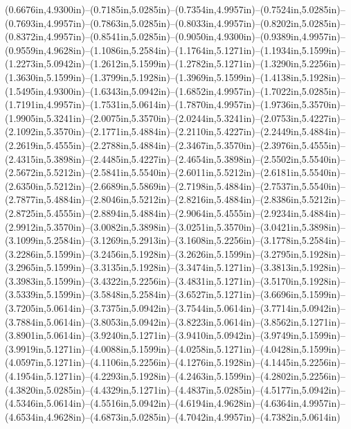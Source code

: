 (0.6676in,4.9300in)--(0.7185in,5.0285in)--(0.7354in,4.9957in)--(0.7524in,5.0285in)--(0.7693in,4.9957in)--(0.7863in,5.0285in)--(0.8033in,4.9957in)--(0.8202in,5.0285in)--(0.8372in,4.9957in)--(0.8541in,5.0285in)--(0.9050in,4.9300in)--(0.9389in,4.9957in)--(0.9559in,4.9628in)--(1.1086in,5.2584in)--(1.1764in,5.1271in)--(1.1934in,5.1599in)--(1.2273in,5.0942in)--(1.2612in,5.1599in)--(1.2782in,5.1271in)--(1.3290in,5.2256in)--(1.3630in,5.1599in)--(1.3799in,5.1928in)--(1.3969in,5.1599in)--(1.4138in,5.1928in)--(1.5495in,4.9300in)--(1.6343in,5.0942in)--(1.6852in,4.9957in)--(1.7022in,5.0285in)--(1.7191in,4.9957in)--(1.7531in,5.0614in)--(1.7870in,4.9957in)--(1.9736in,5.3570in)--(1.9905in,5.3241in)--(2.0075in,5.3570in)--(2.0244in,5.3241in)--(2.0753in,5.4227in)--(2.1092in,5.3570in)--(2.1771in,5.4884in)--(2.2110in,5.4227in)--(2.2449in,5.4884in)--(2.2619in,5.4555in)--(2.2788in,5.4884in)--(2.3467in,5.3570in)--(2.3976in,5.4555in)--(2.4315in,5.3898in)--(2.4485in,5.4227in)--(2.4654in,5.3898in)--(2.5502in,5.5540in)--(2.5672in,5.5212in)--(2.5841in,5.5540in)--(2.6011in,5.5212in)--(2.6181in,5.5540in)--(2.6350in,5.5212in)--(2.6689in,5.5869in)--(2.7198in,5.4884in)--(2.7537in,5.5540in)--(2.7877in,5.4884in)--(2.8046in,5.5212in)--(2.8216in,5.4884in)--(2.8386in,5.5212in)--(2.8725in,5.4555in)--(2.8894in,5.4884in)--(2.9064in,5.4555in)--(2.9234in,5.4884in)--(2.9912in,5.3570in)--(3.0082in,5.3898in)--(3.0251in,5.3570in)--(3.0421in,5.3898in)--(3.1099in,5.2584in)--(3.1269in,5.2913in)--(3.1608in,5.2256in)--(3.1778in,5.2584in)--(3.2286in,5.1599in)--(3.2456in,5.1928in)--(3.2626in,5.1599in)--(3.2795in,5.1928in)--(3.2965in,5.1599in)--(3.3135in,5.1928in)--(3.3474in,5.1271in)--(3.3813in,5.1928in)--(3.3983in,5.1599in)--(3.4322in,5.2256in)--(3.4831in,5.1271in)--(3.5170in,5.1928in)--(3.5339in,5.1599in)--(3.5848in,5.2584in)--(3.6527in,5.1271in)--(3.6696in,5.1599in)--(3.7205in,5.0614in)--(3.7375in,5.0942in)--(3.7544in,5.0614in)--(3.7714in,5.0942in)--(3.7884in,5.0614in)--(3.8053in,5.0942in)--(3.8223in,5.0614in)--(3.8562in,5.1271in)--(3.8901in,5.0614in)--(3.9240in,5.1271in)--(3.9410in,5.0942in)--(3.9749in,5.1599in)--(3.9919in,5.1271in)--(4.0088in,5.1599in)--(4.0258in,5.1271in)--(4.0428in,5.1599in)--(4.0597in,5.1271in)--(4.1106in,5.2256in)--(4.1276in,5.1928in)--(4.1445in,5.2256in)--(4.1954in,5.1271in)--(4.2293in,5.1928in)--(4.2463in,5.1599in)--(4.2802in,5.2256in)--(4.3820in,5.0285in)--(4.4329in,5.1271in)--(4.4837in,5.0285in)--(4.5177in,5.0942in)--(4.5346in,5.0614in)--(4.5516in,5.0942in)--(4.6194in,4.9628in)--(4.6364in,4.9957in)--(4.6534in,4.9628in)--(4.6873in,5.0285in)--(4.7042in,4.9957in)--(4.7382in,5.0614in)
